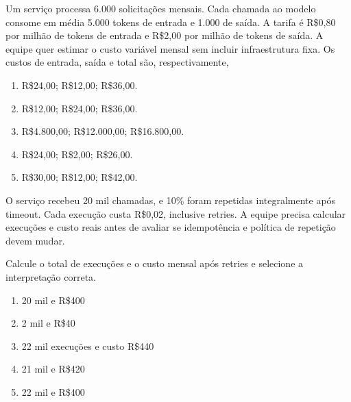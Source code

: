 \TextoBase Um serviço processa 6.000 solicitações mensais. Cada chamada ao modelo consome em média 5.000 tokens de entrada e 1.000 de saída. A tarifa é R\$0,80 por milhão de tokens de entrada e R\$2,00 por milhão de tokens de saída. A equipe quer estimar o custo variável mensal sem incluir infraestrutura fixa.
\FonteDidatica
\Comando Os custos de entrada, saída e total são, respectivamente,
\begin{enumerate}[label=\Alph*)]
\item R\$24,00; R\$12,00; R\$36,00.
\item R\$12,00; R\$24,00; R\$36,00.
\item R\$4.800,00; R\$12.000,00; R\$16.800,00.
\item R\$24,00; R\$2,00; R\$26,00.
\item R\$30,00; R\$12,00; R\$42,00.
\end{enumerate}

\TextoBase

O serviço recebeu 20 mil chamadas, e 10\% foram repetidas integralmente após timeout. Cada execução custa R\$0,02, inclusive retries. A equipe precisa calcular execuções e custo reais antes de avaliar se idempotência e política de repetição devem mudar.

\FonteDidatica

\Comando Calcule o total de execuções e o custo mensal após retries e selecione a interpretação correta.

\begin{enumerate}[label=\Alph*)]

\item 20 mil e R\$400

\item 2 mil e R\$40

\item 22 mil execuções e custo R\$440

\item 21 mil e R\$420

\item 22 mil e R\$400

\end{enumerate}


\TextoBase

